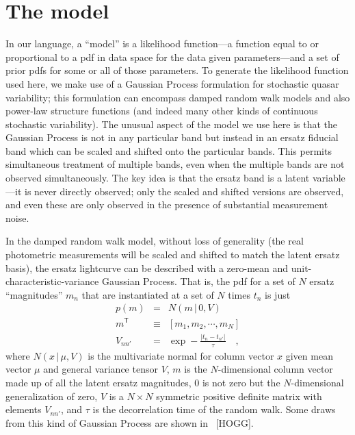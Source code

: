 \documentclass[letterpaper,12pt]{article}
\newcommand{\given}{\,|\,}
\newcommand{\transpose}[1]{{#1}^{\mathsf{T}}}
\begin{document}
\section{The model}

In our language, a ``model'' is a likelihood function---a function
equal to or proportional to a pdf in data space for the data given
parameters---and a set of prior pdfs for some or all of those
parameters.  To generate the likelihood function used here, we make
use of a Gaussian Process formulation for stochastic quasar
variability; this formulation can encompass damped random walk models
and also power-law structure functions (and indeed many other kinds of
continuous stochastic variability).  The unusual aspect of the model
we use here is that the Gaussian Process is not in any particular band
but instead in an ersatz fiducial band which can be scaled and shifted
onto the particular bands.  This permits simultaneous treatment of
multiple bands, even when the multiple bands are not observed
simultaneously.  The key idea is that the ersatz band is a latent
variable---it is never directly observed; only the scaled and shifted
versions are observed, and even these are only observed in the
presence of substantial measurement noise.

In the damped random walk model, without loss of generality (the real
photometric measurements will be scaled and shifted to match the
latent ersatz basis), the ersatz lightcurve can be described with a
zero-mean and unit-characteristic-variance Gaussian Process.  That is,
the pdf for a set of $N$ ersatz ``magnitudes'' $m_n$ that are
instantiated at a set of $N$ times $t_n$ is just
\begin{eqnarray}
p(m) &=& N(m\given 0,V)
\\
\transpose{m} &\equiv& [m_1, m_2, \cdots , m_N]
\\
V_{nn'} &=& \exp -\frac{|t_n - t_{n'}|}{\tau}
\quad ,
\end{eqnarray}
where $N(x\given\mu,V)$ is the multivariate normal for column vector
$x$ given mean vector $\mu$ and general variance tensor $V$, $m$ is
the $N$-dimensional column vector made up of all the latent ersatz
magnitudes, $0$ is not zero but the $N$-dimensional generalization of
zero, $V$ is a $N\times N$ symmetric positive definite matrix with
elements $V_{nn'}$, and $\tau$ is the decorrelation time of the random
walk.  Some draws from this kind of Gaussian Process are shown in
\figurename~[HOGG].
\end{document}
